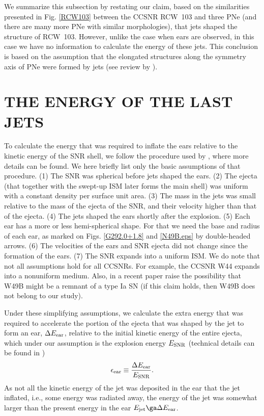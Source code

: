 \documentclass[12pt,preprint,a4paper]{aastex}
\begin{document}
We summarize this subsection by restating our claim, based on the similarities presented in Fig. \ref{RCW103} between the CCSNR RCW~103 and three PNe (and there are many more PNe with similar morphologies), that jets shaped the structure of RCW~103. However, unlike the case when ears are observed, in this case we have no information to calculate the energy of these jets. This conclusion is based on the assumption that the elongated structures along the symmetry axis of PNe were formed by jets (see review by \citealt{Soker2016Rev}).
 
\section{THE ENERGY OF THE LAST JETS }
\label{sec:energy}

To calculate the energy that was required to inflate the ears relative to the kinetic energy of the SNR shell, we follow the procedure used by \cite{GrichenerSoker2017}, where more details can be found. We here briefly list only the basic assumptions of that procedure. 
(1) The SNR was spherical before jets shaped the ears. (2) The ejecta (that together with the swept-up ISM later forms the main shell) was uniform with a constant density per surface unit area. (3) The mass in the jets was small relative to the mass of the ejecta of the SNR, and their velocity higher than that of the ejecta. (4) The jets shaped the ears shortly after the explosion. (5) Each ear has a more or less hemi-spherical shape. For that we need the base and radius of each ear, as marked on Figs. \ref{G292.0+1.8} and \ref{N49B.eps} by double-headed arrows. (6) The velocities of the ears and SNR ejecta did not change since the formation of the ears. (7) The SNR expands into  a uniform ISM.  
We do note that not all assumptions hold for all CCSNRs. For example, the CCSNR W44 expands into a nonuniform medium. Also, in a recent paper \cite{ZhouVink2017} raise the possibility that W49B might be a remnant of a type Ia SN (if this claim holds, then W49B does not belong to our study). 

Under these simplifying assumptions, we calculate the extra energy that was required to accelerate the portion of the ejecta that was shaped by the jet to form an ear, $\Delta E_{\rm ear}$, relative to the initial kinetic energy of the entire ejecta, which under our assumption is the explosion energy $E_{\rm SNR}$ (technical details can be found in \citealt{GrichenerSoker2017}) 
\begin{equation}
\epsilon_{\rm ear} \equiv \frac{\Delta E_{\rm ear}}{E_{\rm SNR}} . 
\label{eq:epsilon1}
\end{equation}
As not all the kinetic energy of the jet was deposited in the ear that the jet inflated, i.e., some energy was radiated away, the energy of the jet was somewhat larger than the present energy in the ear $E_{\rm jet} \ga \Delta E_{\rm ear}$. 
\end{document}
